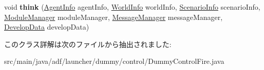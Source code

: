 \begin{DoxyCompactItemize}
\hypertarget{classadf_1_1launcher_1_1dummy_1_1control_1_1DummyControlFire_aaa747fa390bce6537f0462e51dfb8faa}{}\label{classadf_1_1launcher_1_1dummy_1_1control_1_1DummyControlFire_aaa747fa390bce6537f0462e51dfb8faa} 
void {\bfseries think} (\hyperlink{classadf_1_1agent_1_1info_1_1AgentInfo}{Agent\+Info} agent\+Info, \hyperlink{classadf_1_1agent_1_1info_1_1WorldInfo}{World\+Info} world\+Info, \hyperlink{classadf_1_1agent_1_1info_1_1ScenarioInfo}{Scenario\+Info} scenario\+Info, \hyperlink{classadf_1_1agent_1_1module_1_1ModuleManager}{Module\+Manager} module\+Manager, \hyperlink{classadf_1_1agent_1_1communication_1_1MessageManager}{Message\+Manager} message\+Manager, \hyperlink{classadf_1_1agent_1_1develop_1_1DevelopData}{Develop\+Data} develop\+Data)
\end{DoxyCompactItemize}


このクラス詳解は次のファイルから抽出されました\+:\begin{DoxyCompactItemize}
\item 
src/main/java/adf/launcher/dummy/control/Dummy\+Control\+Fire.\+java\end{DoxyCompactItemize}
